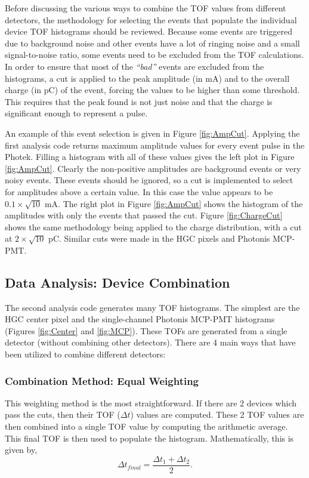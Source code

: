 \documentclass[twocolumn,aps,prd,reprint,superscriptaddress,floatfix]{revtex4-1}
\begin{document}
Before discussing the various ways to combine the TOF values from different detectors, the methodology for selecting the events that populate the individual device TOF histograms should be reviewed.
Because some events are triggered due to background noise and other events have a lot of ringing noise and a small signal-to-noise ratio, some events need to be excluded from the TOF calculations. 
In order to ensure that most of the \textit{``bad''} events are excluded from the histograms, a cut is applied to the peak amplitude (in mA) and to the overall charge (in pC) of the event, forcing the values to be higher than some threshold. 
This requires that the peak found is not just noise and that the charge is significant enough to represent a pulse.

An example of this event selection is given in Figure \ref{fig:AmpCut}.
Applying the first analysis code returns maximum amplitude values for every event pulse in the Photek. 
Filling a histogram with all of these values gives the left plot in Figure \ref{fig:AmpCut}.
Clearly the non-positive amplitudes are background events or very noisy events. 
These events should be ignored, so a cut is implemented to select for amplitudes above a certain value. 
In this case the value appears to be $0.1\times\sqrt{10}$ mA. 
The right plot in Figure \ref{fig:AmpCut} shows the histogram of the amplitudes with only the events that passed the cut. 
Figure \ref{fig:ChargeCut} shows the same methodology being applied to the charge distribution, with a cut at $2\times\sqrt{10}$ pC. 
Similar cuts were made in the HGC pixels and Photonis MCP-PMT. 

\subsection{Data Analysis: Device Combination}
The second analysis code generates many TOF histograms. 
The simplest are the HGC center pixel and the single-channel Photonis MCP-PMT histograms (Figures \ref{fig:Center} and \ref{fig:MCP}). 
These TOFs are generated from a single detector (without combining other detectors). 
There are 4 main ways that have been utilized to combine different detectors:

\subsubsection{Combination Method: Equal Weighting}
This weighting method is the most straightforward. 
If there are 2 devices which pass the cuts, then their TOF ($\Delta t$) values are computed. 
These 2 TOF values are then combined into a single TOF value by computing the arithmetic average. 
This final TOF is then used to populate the histogram. 
Mathematically, this is given by,
\[
\Delta t_{final} =
\dfrac{\Delta t_1 + \Delta t_2}{2} .
\]
\end{document}
